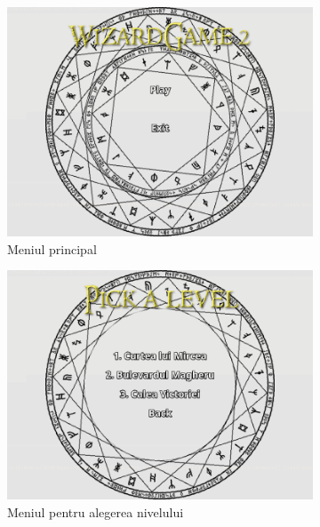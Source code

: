 \documentclass{article}
\begin{document}
    \begin{figure}[H]
        \centering
        \begin{subfigure}{0.45\textwidth}
            \includegraphics[width=\textwidth]{main-menu}
            \caption{Meniul principal}
            \label{fig:first}
        \end{subfigure}
        \hfill
        \begin{subfigure}{0.45\textwidth}
            \includegraphics[width=\textwidth]{level-select}
            \caption{Meniul pentru alegerea nivelului}
            \label{fig:second}
        \end{subfigure}
        \begin{subfigure}{0.45\textwidth}

\end{subfigure}
\end{figure}
\end{document}
